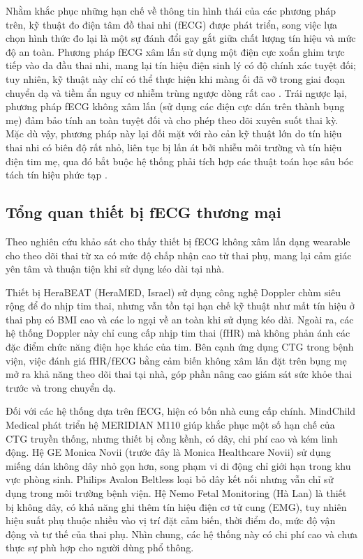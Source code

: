 \documentclass[../DoAn.tex]{subfiles}
\begin{document}
Nhằm khắc phục những hạn chế về thông tin hình thái của các phương pháp trên, kỹ thuật đo điện tâm đồ thai nhi (fECG) được phát triển, song việc lựa chọn hình thức đo lại là một sự đánh đổi gay gắt giữa chất lượng tín hiệu và mức độ an toàn. Phương pháp fECG xâm lấn sử dụng một điện cực xoắn ghim trực tiếp vào da đầu thai nhi, mang lại tín hiệu điện sinh lý có độ chính xác tuyệt đối; tuy nhiên, kỹ thuật này chỉ có thể thực hiện khi màng ối đã vỡ trong giai đoạn chuyển dạ và tiềm ẩn nguy cơ nhiễm trùng ngược dòng rất cao \cite{neilsonFetalElectrocardiogramECG2015}. Trái ngược lại, phương pháp fECG không xâm lấn (sử dụng các điện cực dán trên thành bụng mẹ) đảm bảo tính an toàn tuyệt đối và cho phép theo dõi xuyên suốt thai kỳ. Mặc dù vậy, phương pháp này lại đối mặt với rào cản kỹ thuật lớn do tín hiệu thai nhi có biên độ rất nhỏ, liên tục bị lấn át bởi nhiễu môi trường và tín hiệu điện tim mẹ, qua đó bắt buộc hệ thống phải tích hợp các thuật toán học sâu bóc tách tín hiệu phức tạp \cite{sameniReviewFetalECG2010}.

\subsection{Tổng quan thiết bị fECG thương mại}

Theo nghiên cứu khảo sát \cite{karmakarConsumerInsightsFeasibility2025} cho thấy thiết bị fECG không xâm lấn dạng wearable cho theo dõi thai từ xa có mức độ chấp nhận cao từ thai phụ, mang lại cảm giác yên tâm và thuận tiện khi sử dụng kéo dài tại nhà.

Thiết bị HeraBEAT (HeraMED, Israel) sử dụng công nghệ Doppler chùm siêu rộng để đo nhịp tim thai, nhưng vẫn tồn tại hạn chế kỹ thuật như mất tín hiệu ở thai phụ có BMI cao và các lo ngại về an toàn khi sử dụng kéo dài. Ngoài ra, các hệ thống Doppler này chỉ cung cấp nhịp tim thai (fHR) mà không phản ánh các đặc điểm chức năng điện học khác của tim. Bên cạnh ứng dụng CTG trong bệnh viện, việc đánh giá fHR/fECG bằng cảm biến không xâm lấn đặt trên bụng mẹ mở ra khả năng theo dõi thai tại nhà, góp phần nâng cao giám sát sức khỏe thai trước và trong chuyển dạ.

Đối với các hệ thống dựa trên fECG, hiện có bốn nhà cung cấp chính. MindChild Medical phát triển hệ MERIDIAN M110 giúp khắc phục một số hạn chế của CTG truyền thống, nhưng thiết bị cồng kềnh, có dây, chi phí cao và kém linh động. Hệ GE Monica Novii (trước đây là Monica Healthcare Novii) sử dụng miếng dán không dây nhỏ gọn hơn, song phạm vi di động chỉ giới hạn trong khu vực phòng sinh. Philips Avalon Beltless loại bỏ dây kết nối nhưng vẫn chỉ sử dụng trong môi trường bệnh viện. Hệ Nemo Fetal Monitoring (Hà Lan) là thiết bị không dây, có khả năng ghi thêm tín hiệu điện cơ tử cung (EMG), tuy nhiên hiệu suất phụ thuộc nhiều vào vị trí đặt cảm biến, thời điểm đo, mức độ vận động và tư thế của thai phụ. Nhìn chung, các hệ thống này có chi phí cao và chưa thực sự phù hợp cho người dùng phổ thông.
\end{document}
